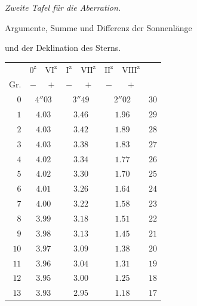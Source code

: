 \begin{center}
\textit{Zweite Tafel für die Aberration.}\par\medskip
Argumente, Summe und Differenz der Sonnenlänge\par
und der Deklination des Sterns.\par\medskip
\begingroup\small\setlength{\tabcolsep}{8pt}
\begin{tabular}{r||cc|cc|cc||r}
&$0^{\mathrm z}$&$\mathrm{VI}^{\mathrm z}$&$\mathrm I^{\mathrm z}$&$\mathrm{VII}^{\mathrm z}$&$\mathrm{II}^{\mathrm z}$&$\mathrm{VIII}^{\mathrm z}$&\\
Gr.&$-$&$+$&$-$&$+$&$-$&$+$&\\\hline
$0$&\multicolumn{2}{c|}{$4''03$}&\multicolumn{2}{c|}{$3''49$}&\multicolumn{2}{c||}{$2''02$}&$30$\\
$1$&\multicolumn{2}{c|}{$4.03$}&\multicolumn{2}{c|}{$3.46$}&\multicolumn{2}{c||}{$1.96$}&$29$\\
$2$&\multicolumn{2}{c|}{$4.03$}&\multicolumn{2}{c|}{$3.42$}&\multicolumn{2}{c||}{$1.89$}&$28$\\
$3$&\multicolumn{2}{c|}{$4.03$}&\multicolumn{2}{c|}{$3.38$}&\multicolumn{2}{c||}{$1.83$}&$27$\\
$4$&\multicolumn{2}{c|}{$4.02$}&\multicolumn{2}{c|}{$3.34$}&\multicolumn{2}{c||}{$1.77$}&$26$\\
$5$&\multicolumn{2}{c|}{$4.02$}&\multicolumn{2}{c|}{$3.30$}&\multicolumn{2}{c||}{$1.70$}&$25$\\[3pt]
$6$&\multicolumn{2}{c|}{$4.01$}&\multicolumn{2}{c|}{$3.26$}&\multicolumn{2}{c||}{$1.64$}&$24$\\
$7$&\multicolumn{2}{c|}{$4.00$}&\multicolumn{2}{c|}{$3.22$}&\multicolumn{2}{c||}{$1.58$}&$23$\\
$8$&\multicolumn{2}{c|}{$3.99$}&\multicolumn{2}{c|}{$3.18$}&\multicolumn{2}{c||}{$1.51$}&$22$\\
$9$&\multicolumn{2}{c|}{$3.98$}&\multicolumn{2}{c|}{$3.13$}&\multicolumn{2}{c||}{$1.45$}&$21$\\
$10$&\multicolumn{2}{c|}{$3.97$}&\multicolumn{2}{c|}{$3.09$}&\multicolumn{2}{c||}{$1.38$}&$20$\\[3pt]
$11$&\multicolumn{2}{c|}{$3.96$}&\multicolumn{2}{c|}{$3.04$}&\multicolumn{2}{c||}{$1.31$}&$19$\\
$12$&\multicolumn{2}{c|}{$3.95$}&\multicolumn{2}{c|}{$3.00$}&\multicolumn{2}{c||}{$1.25$}&$18$\\
$13$&\multicolumn{2}{c|}{$3.93$}&\multicolumn{2}{c|}{$2.95$}&\multicolumn{2}{c||}{$1.18$}&$17$\\

\end{tabular}
\end{center}

